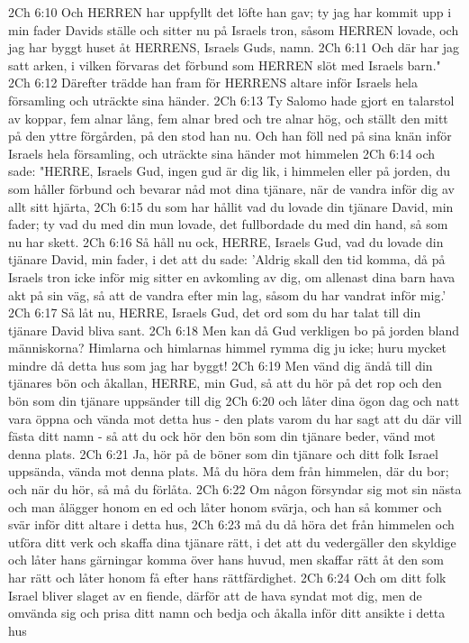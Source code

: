 2Ch 6:10  Och HERREN har uppfyllt det löfte han gav; ty jag har kommit upp i min fader Davids ställe och sitter nu på Israels tron, såsom HERREN lovade, och jag har byggt huset åt HERRENS, Israels Guds, namn.
2Ch 6:11  Och där har jag satt arken, i vilken förvaras det förbund som HERREN slöt med Israels barn."
2Ch 6:12  Därefter trädde han fram för HERRENS altare inför Israels hela församling och uträckte sina händer.
2Ch 6:13  Ty Salomo hade gjort en talarstol av koppar, fem alnar lång, fem alnar bred och tre alnar hög, och ställt den mitt på den yttre förgården, på den stod han nu. Och han föll ned på sina knän inför Israels hela församling, och uträckte sina händer mot himmelen
2Ch 6:14  och sade: "HERRE, Israels Gud, ingen gud är dig lik, i himmelen eller på jorden, du som håller förbund och bevarar nåd mot dina tjänare, när de vandra inför dig av allt sitt hjärta,
2Ch 6:15  du som har hållit vad du lovade din tjänare David, min fader; ty vad du med din mun lovade, det fullbordade du med din hand, så som nu har skett.
2Ch 6:16  Så håll nu ock, HERRE, Israels Gud, vad du lovade din tjänare David, min fader, i det att du sade: 'Aldrig skall den tid komma, då på Israels tron icke inför mig sitter en avkomling av dig, om allenast dina barn hava akt på sin väg, så att de vandra efter min lag, såsom du har vandrat inför mig.'
2Ch 6:17  Så låt nu, HERRE, Israels Gud, det ord som du har talat till din tjänare David bliva sant.
2Ch 6:18  Men kan då Gud verkligen bo på jorden bland människorna? Himlarna och himlarnas himmel rymma dig ju icke; huru mycket mindre då detta hus som jag har byggt!
2Ch 6:19  Men vänd dig ändå till din tjänares bön och åkallan, HERRE, min Gud, så att du hör på det rop och den bön som din tjänare uppsänder till dig
2Ch 6:20  och låter dina ögon dag och natt vara öppna och vända mot detta hus - den plats varom du har sagt att du där vill fästa ditt namn - så att du ock hör den bön som din tjänare beder, vänd mot denna plats.
2Ch 6:21  Ja, hör på de böner som din tjänare och ditt folk Israel uppsända, vända mot denna plats. Må du höra dem från himmelen, där du bor; och när du hör, så må du förlåta.
2Ch 6:22  Om någon försyndar sig mot sin nästa och man ålägger honom en ed och låter honom svärja, och han så kommer och svär inför ditt altare i detta hus,
2Ch 6:23  må du då höra det från himmelen och utföra ditt verk och skaffa dina tjänare rätt, i det att du vedergäller den skyldige och låter hans gärningar komma över hans huvud, men skaffar rätt åt den som har rätt och låter honom få efter hans rättfärdighet.
2Ch 6:24  Och om ditt folk Israel bliver slaget av en fiende, därför att de hava syndat mot dig, men de omvända sig och prisa ditt namn och bedja och åkalla inför ditt ansikte i detta hus
